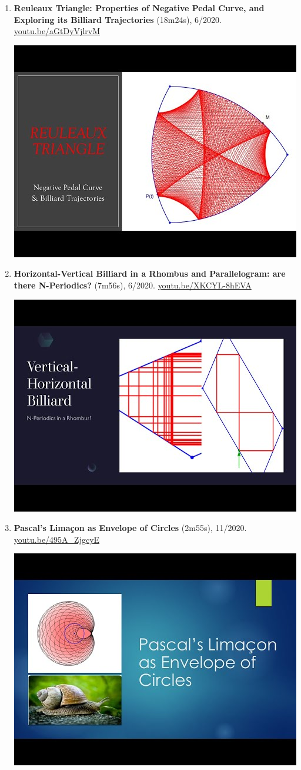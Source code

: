 \documentclass[12pt]{article}
\begin{document}
\begin{enumerate}[resume]
% 
\item \textbf{Reuleaux Triangle: Properties of Negative Pedal Curve, and Exploring its Billiard Trajectories} (18m24s), 6/2020. \href{https://youtu.be/aGtDyVjlrvM}{\url{youtu.be/aGtDyVjlrvM}}
\begin{center}\includegraphics[width=.5\textwidth]{pics/aGtDyVjlrvM.jpg}\end{center}
% 
\item \textbf{Horizontal-Vertical Billiard in a Rhombus and Parallelogram: are there N-Periodics?} (7m56s), 6/2020. \href{https://youtu.be/XKCYL-8hEVA}{\url{youtu.be/XKCYL-8hEVA}}
\begin{center}\includegraphics[width=.5\textwidth]{pics/XKCYL-8hEVA.jpg}\end{center}
% 
\item \textbf{Pascal's Limaçon as Envelope of Circles} (2m55s), 11/2020. \href{https://youtu.be/495A_ZjgcyE}{\url{youtu.be/495A\_ZjgcyE}}
\begin{center}\includegraphics[width=.5\textwidth]{pics/495A_ZjgcyE.jpg}\end{center}

\end{enumerate}
\end{document}
